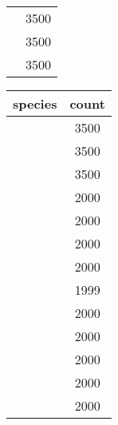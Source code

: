 \documentclass[12pt]{article}
\begin{document}
\begin{table}[htbp]
\begin{tabular}{l c }
	\addlinespace[1pt]
	 \phantom{} & \num{3500}\\
	\addlinespace[1pt]
	 \phantom{} & \num{3500}\\
	\addlinespace[1pt]
	 \phantom{} & \num{3500}\\
	\bottomrule
\end{tabular}
\begin{tabular}{l c }
	\toprule
	\textbf{species} & \textbf{count} \\
	\midrule
	 \phantom{} & \num{3500}\\
	\addlinespace[1pt]
	 \phantom{} & \num{3500}\\
	\addlinespace[1pt]
	 \phantom{} & \num{3500}\\
	\addlinespace[1pt]
	 \phantom{} & \num{2000}\\
	\addlinespace[1pt]
	 \phantom{} & \num{2000}\\
	\addlinespace[1pt]
	 \phantom{} & \num{2000}\\
	\addlinespace[1pt]
	 \phantom{} & \num{2000}\\
	\addlinespace[1pt]
	 \phantom{} & \num{1999}\\
	\addlinespace[1pt]
	 \phantom{} & \num{2000}\\
	\addlinespace[1pt]
	 \phantom{} & \num{2000}\\
	\addlinespace[1pt]
	 \phantom{} & \num{2000}\\
	\addlinespace[1pt]
	 \phantom{} & \num{2000}\\
	\addlinespace[1pt]
	 \phantom{} & \num{2000}\\
	\bottomrule
\end{tabular}
\end{table}
\end{document}
